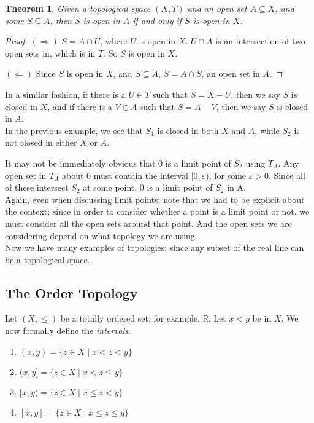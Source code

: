 \documentclass[12pt]{report}
\newcommand{\example}{  \noindent{\sc Example }\hspace{5pt} }
\newcommand{\reals}{\mathbb{R}}
\newtheorem{theorem}{Theorem}[section]
\begin{document}
\begin{theorem}
Given a topological space $(X,T)$ and an open set $A \subseteq X$, and some $S
\subseteq A$, then $S$ is open in $A$ if and only if $S$ is open in $X$.
\end{theorem}

\begin{proof}
$(\Rightarrow)$ $S = A \cap U$, where $U$ is open in $X$. $U \cap A$ is an
intersection of two open sets in, which is in $T$. So $S$ is open in $X$.

$(\Leftarrow)$ Since $S$ is open in $X$, and $S \subseteq A$, $S = A \cap S$,
an open set in $A$.
\end{proof}

In a similar fashion, if there is a $U \in T$ such that $S = X - U$, then we
say $S$ is closed in $X$, and if there is a $V \in A$ such that $S = A - V$,
then we say $S$ is closed in $A$.\\

\example In the previous example, we see that $S_1$ is closed in both $X$ and
$A$, while $S_2$ is not closed in either $X$ or $A$. 

It may not be immediately obvious that 0 is a limit point of $S_2$
using $T_A$. Any open set in $T_A$ about 0 must contain the interval
$[0, \varepsilon)$, for some $\varepsilon > 0$. Since all of these intersect
$S_2$ at some point, 0 is a limit point of $S_2$ in A.\\

Again, even when discussing limit points; note that we had to be explicit
about the context; since in order to consider whether a point is a limit point
or not, we must consider all the open sets around that point. And the
open sets we are considering depend on what topology we are using.\\

Now we have many examples of topologies; since any subset of the real
line can be a topological space.\\

\subsection{The Order Topology}

Let $(X, \leq)$ be a totally ordered set; for example, $\reals$. Let $x < y$
be in $X$. We now formally define  the {\em intervals}.
\begin{enumerate}
\item[] $(x,y) = \{z \in X \mid x < z < y \}$
\item[] $(x,y] = \{z \in X \mid x < z \leq y \}$
\item[] $[x,y) = \{z \in X \mid x \leq z < y \}$
\item[] $[x,y] = \{z \in X \mid x \leq z \leq y \}$
\end{enumerate}
\end{document}
